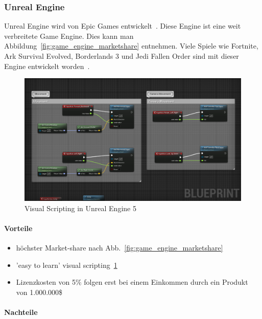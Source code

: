 \subsubsection{Unreal Engine}
\label{sec:unreal_engine}

Unreal Engine wird von Epic Games entwickelt~\cite{UNEAL_ENGINE_OWNER_2022}.
Diese Engine ist eine weit verbreitete Game Engine.
Dies kann man Abbildung~\ref{fig:game_engine_marketshare} entnehmen.
Viele Spiele wie Fortnite, Ark Survival Evolved, Borderlands 3 und Jedi Fallen Order sind mit dieser Engine entwickelt worden~\cite{WIKIPEDIA_UNREAL_GAME_LIST}.

\begin{figure}
    \centering
    \includegraphics[scale=0.3]{pics/visual_scripting_unreal_engine}
    \caption{Visual Scripting in Unreal Engine 5}
    \label{fig:visual_scripting_unreal_engine}
\end{figure}

\paragraph{Vorteile}

\begin{itemize}
    \item höchster Market-share nach Abb.~\ref{fig:game_engine_marketshare}
    \item 'easy to learn' visual scripting~\ref{fig:visual_scripting_unreal_engine} %
    \item Lizenzkosten von 5\% folgen erst bei einem Einkommen durch ein Produkt von 1.000.000\$~\cite{UNREAL_ENGINE_PRICING_2022}
\end{itemize}

\paragraph{Nachteile}

